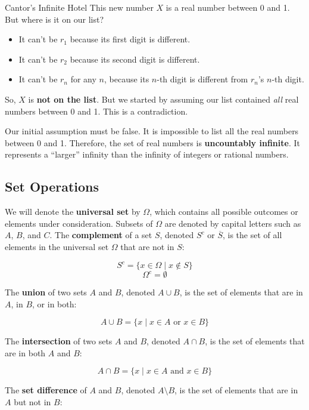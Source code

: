 \begin{funfactsbreak}{Cantor's Infinite Hotel}
This new number $X$ is a real number between 0 and 1. But where is it on our list?
\begin{itemize}
\item It can't be $r_1$ because its first digit is different.
\item It can't be $r_2$ because its second digit is different.
\item It can't be $r_n$ for any $n$, because its $n$-th digit is different from $r_n$'s $n$-th digit.
\end{itemize}
So, $X$ is \textbf{not on the list}. But we started by assuming our list contained \emph{all} real numbers between 0 and 1. This is a contradiction.

Our initial assumption must be false. It is impossible to list all the real numbers between 0 and 1. Therefore, the set of real numbers is \textbf{uncountably infinite}. It represents a ``larger'' infinity than the infinity of integers or rational numbers.

\end{funfactsbreak}

\subsection{Set Operations}
We will denote the \textbf{universal set} by \( \Omega \), which contains all possible outcomes or elements under consideration. Subsets of \( \Omega \) are denoted by capital letters such as \( A \), \( B \), and \( C \).
The \textbf{complement} of a set \( S \), denoted \( S^c \) or \( \overline{S} \), is the set of all elements in the universal set \( \Omega \) that are not in \( S \):

\[
S^c = \{ x \in \Omega \mid x \notin S \}
\]
\[ \Omega^c = \emptyset   \]

The \textbf{union} of two sets \( A \) and \( B \), denoted \( A \cup B \), is the set of elements that are in \( A \), in \( B \), or in both:

\[
A \cup B = \{ x \mid x \in A \text{ or } x \in B \}
\]

The \textbf{intersection} of two sets \( A \) and \( B \), denoted \( A \cap B \), is the set of elements that are in both \( A \) and \( B \):

\[
A \cap B = \{ x \mid x \in A \text{ and } x \in B \}
\]

The \textbf{set difference} of \( A \) and \( B \), denoted \( A \setminus B \), is the set of elements that are in \( A \) but not in \( B \):

